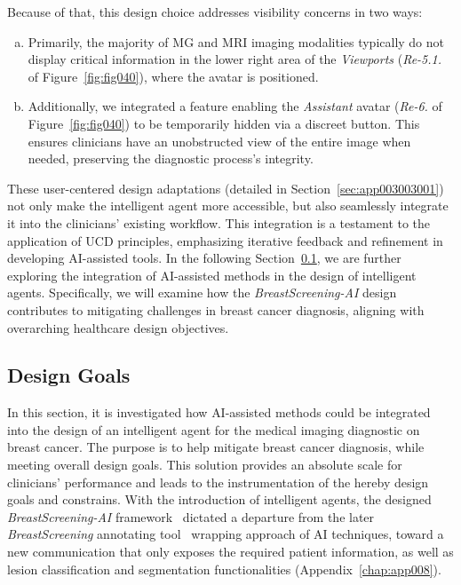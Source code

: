 
\noindent
\textcolor{revised}{Because of that, this design choice addresses visibility concerns in two ways:}

\vspace{1.00mm}


\begin{enumerate}[(a)]
\item \textcolor{revised}{Primarily, the majority of \ac{MG} and \ac{MRI} imaging modalities typically do not display critical information in the lower right area of the {\it Viewports} ({\it Re-5.1.} of Figure~\ref{fig:fig040}), where the avatar is positioned.}
\item \textcolor{revised}{Additionally, we integrated a feature enabling the {\it Assistant} avatar ({\it Re-6.} of Figure~\ref{fig:fig040}) to be temporarily hidden via a discreet button.
This ensures clinicians have an unobstructed view of the entire image when needed, preserving the diagnostic process's integrity.}
\end{enumerate}


\vspace{1.00mm}

\textcolor{revised}{These user-centered design adaptations (detailed in Section~\ref{sec:app003003001}) not only make the intelligent agent more accessible, but also seamlessly integrate it into the clinicians' existing workflow.
This integration is a testament to the application of \ac{UCD} principles, emphasizing iterative feedback and refinement in developing \acs{AI}-assisted tools.
In the following Section~\ref{sec:chap005003004}, we are further exploring the integration of \acs{AI}-assisted methods in the design of intelligent agents.
Specifically, we will examine how the {\it BreastScreening-AI} design contributes to mitigating challenges in breast cancer diagnosis, aligning with overarching healthcare design objectives.}

\subsection{Design Goals}
\label{sec:chap005003004}

In this section, it is investigated how \ac{AI}-assisted methods could be integrated into the design of an intelligent agent for the medical imaging diagnostic on breast cancer.
The purpose is to help mitigate breast cancer diagnosis, while meeting overall design goals.
This solution provides an absolute scale for clinicians' performance and leads to the instrumentation of the hereby design goals and constrains.
With the introduction of intelligent agents, the designed {\it BreastScreening-AI} framework~\cite{CALISTO2021102607} dictated a departure from the later {\it BreastScreening} annotating tool~\cite{10.1145/3399715.3399744} wrapping approach of \ac{AI} techniques, toward a new communication that only exposes the required patient information, as well as lesion classification and segmentation functionalities (Appendix~\ref{chap:app008}).

